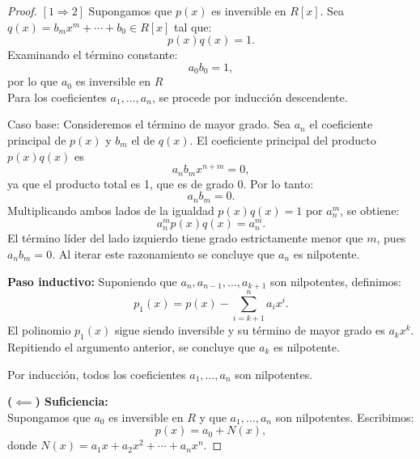 \begin{proof}
	
	\medskip
	\noindent $[ 1 \Rightarrow 2]$
	Supongamos que \( p(x) \) es inversible en \( R[x] \). Sea \( q(x) = b_m x^m + \cdots + b_0 \in R[x] \) tal que:
	\[
	p(x) q(x) = 1.
	\]
	Examinando el término constante:
	\[
	a_0 b_0 = 1,
	\]
	por lo que \( a_0 \) es inversible en \( R \)\\
	
	\noindent Para los coeficientes \( a_1, \dots, a_n \), se procede por inducción descendente.
	
	\medskip
	
	\noindent Caso base: Consideremos el término de mayor grado. Sea \( a_n \) el coeficiente principal de \( p(x) \) y \( b_m \) el de \( q(x) \). El coeficiente principal del producto \( p(x)q(x) \) es
	\[
	a_n b_m x^{n + m} = 0,
	\]
	ya que el producto total es 1, que es de grado 0. Por lo tanto:
	\[
	a_n b_m = 0.
	\]
	Multiplicando ambos lados de la igualdad \( p(x)q(x) = 1 \) por \( a_n^m \), se obtiene:
	\[
	a_n^m p(x) q(x) = a_n^m.
	\]
	El término líder del lado izquierdo tiene grado estrictamente menor que \( m \), pues \( a_n b_m = 0 \). Al iterar este razonamiento se concluye que \( a_n \) es nilpotente.
	
	\medskip
	
	\noindent \textbf{Paso inductivo:} Suponiendo que \( a_n, a_{n-1}, \dots, a_{k+1} \) son nilpotentes, definimos:
	\[
	p_1(x) = p(x) - \sum_{i = k+1}^n a_i x^i.
	\]
	El polinomio \( p_1(x) \) sigue siendo inversible y su término de mayor grado es \( a_k x^k \). Repitiendo el argumento anterior, se concluye que \( a_k \) es nilpotente.
	
	Por inducción, todos los coeficientes \( a_1, \dots, a_n \) son nilpotentes.
	
	
	
	
	
	
	
	
	
	
	
	
	
	
	
	
	
	
	
	
	
	
	
	
	\medskip
	
	\noindent \textbf{($\impliedby$) Suficiencia:} \\
	Supongamos que \( a_0 \) es inversible en \( R \) y que \( a_1, \dots, a_n \) son nilpotentes. Escribimos:
	\[
	p(x) = a_0 + N(x),
	\]
	donde \( N(x) = a_1x + a_2x^2 + \cdots + a_nx^n \).
	

\end{proof}
